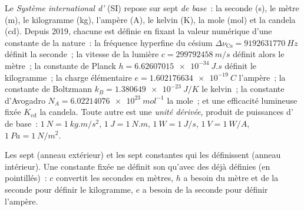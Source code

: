 \begin{definition}\label{def:b1:units-dimensions:si}
Le \emph{Système international d'} (SI) repose sur sept
\emph{ de base}~: la seconde (\unit{s}), le mètre (\unit{m}), le
kilogramme (\unit{kg}), l'ampère (\unit{A}), le kelvin (\unit{K}), la
mole (\unit{mol}) et la candela (\unit{cd}). Depuis 2019, chacune est
définie en fixant la valeur numérique d'une constante de la nature~: la
fréquence hyperfine du césium $\Delta\nu_{\mathrm{Cs}} = \qty{9192631770}{Hz}$
définit la seconde~; la vitesse de la lumière $c = \qty{299792458}{m/s}$
définit alors le mètre~; la constante de Planck
$h = \qty{6.62607015e-34}{J.s}$ définit le kilogramme~; la charge
élémentaire $e = \qty{1.602176634e-19}{C}$ l'ampère~; la constante de
Boltzmann $k_B = \qty{1.380649e-23}{J/K}$ le kelvin~; la constante
d'Avogadro $N_A = \qty{6.02214076e23}{mol^{-1}}$ la mole~; et une
efficacité lumineuse fixée $K_{\mathrm{cd}}$ la candela. Toute autre
 est une \emph{unité dérivée}, produit de
puissances d' de base~: $\qty{1}{N} = \qty{1}{kg.m/s^2}$,
$\qty{1}{J} = \qty{1}{N.m}$, $\qty{1}{W} = \qty{1}{J/s}$,
$\qty{1}{V} = \qty{1}{W/A}$, $\qty{1}{Pa} = \qty{1}{N/m^2}$.
\end{definition}

\begin{omfigure}

{\small Les sept  (anneau extérieur) et les sept
constantes qui les définissent (anneau intérieur). Une constante fixée
ne définit son  qu'avec des  déjà définies (en pointillés)~:
$c$ convertit les secondes en mètres, $h$ a besoin du mètre et de la
seconde pour définir le kilogramme, $e$ a besoin de la seconde pour
définir l'ampère.}
\end{omfigure}

